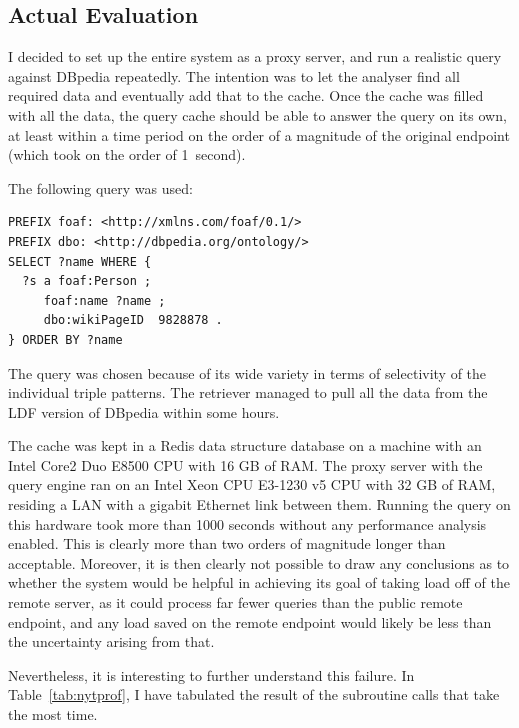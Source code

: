 \subsection{Actual Evaluation}

I decided to set up the entire system as a proxy server, and run a
realistic query against DBpedia repeatedly. The intention was to let
the analyser find all required data and eventually add that to the
cache. Once the cache was filled with all the data, the query cache
should be able to answer the query on its own, at least within a time
period on the order of a magnitude of the original endpoint (which
took on the order of 1~second). 

The following query was used:

\begin{verbatim}
PREFIX foaf: <http://xmlns.com/foaf/0.1/>
PREFIX dbo: <http://dbpedia.org/ontology/>
SELECT ?name WHERE {
  ?s a foaf:Person ;
     foaf:name ?name ;
     dbo:wikiPageID  9828878 .
} ORDER BY ?name
\end{verbatim}

The query was chosen because of its wide variety in terms of
selectivity of the individual triple patterns. The retriever managed
to pull all the data from the LDF version of DBpedia
within some hours. 

The cache was kept in a Redis data structure database on a machine
with an Intel Core2 Duo E8500 CPU with 16 GB of RAM. The proxy server
with the query engine ran on an Intel Xeon CPU E3-1230 v5 CPU with 32
GB of RAM, residing a LAN with a gigabit Ethernet link between
them. Running the query on this hardware took more than 1000 seconds
without any performance analysis enabled. This is clearly more than
two orders of magnitude longer than acceptable. Moreover, it is then
clearly not possible to draw any conclusions as to whether the system
would be helpful in achieving its goal of taking load off of the
remote server, as it could process far fewer queries than the public
remote endpoint, and any load saved on the remote endpoint would
likely be less than the uncertainty arising from that.

Nevertheless, it is interesting to further understand this failure. In
Table~\ref{tab:nytprof}, I have tabulated the result of the subroutine
calls that take the most time.

